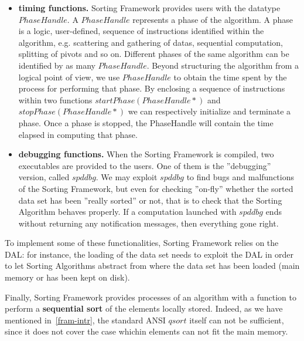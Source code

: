\begin{itemize}
\item \textbf{timing functions.} Sorting Framework provides users with the datatype $PhaseHandle$. A $PhaseHandle$ represents a phase of the algorithm. A phase is a logic, user-defined, sequence of instructions identified within the algorithm,  e.g. scattering and gathering of datas, sequential computation, splitting of pivots and so on. Different phases of the same algorithm can be identified by as many $PhaseHandle$. Beyond structuring the algorithm from a logical point of view, we use $PhaseHandle$ to obtain the time spent by the process for performing that phase. By enclosing a sequence of instructions within two functions $startPhase(PhaseHandle*)$ and $stopPhase(PhaseHandle*)$ we can respectively initialize and terminate a phase. Once a phase is stopped, the PhaseHandle will contain the time elapsed in computing that phase. 
\item \textbf{debugging functions.} When the Sorting Framework is compiled, two executables are provided to the users. One of them is the ''debugging'' version, called $spddbg$. We may exploit $spddbg$ to find bugs and malfunctions of the Sorting Framework, but even for checking ''on-fly'' whether the sorted data set has been ''really sorted'' or not, that is to check that the Sorting Algorithm behaves properly. If a computation launched with $spddbg$ ends without returning any notification messages, then everything gone right. 
\end{itemize}
To implement some of these functionalities, Sorting Framework relies on the DAL: for instance, the loading of the data set needs to exploit the DAL in order to let Sorting Algorithms abstract from where the data set has been loaded (main memory or has been kept on disk).

Finally, Sorting Framework provides processes of an algorithm with a function to perform a \textbf{sequential sort} of the elements locally stored. Indeed, as we have mentioned in~\ref{fram-intr}, the standard ANSI $qsort$ itself can not be sufficient, since it does not cover the case whichin elements can not fit the main memory.
